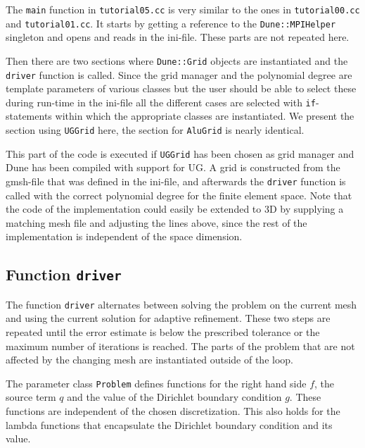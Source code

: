 \documentclass[a4paper,12pt]{article}
\begin{document}
The \lstinline{main} function  in \lstinline{tutorial05.cc} is very similar to the ones
in \lstinline{tutorial00.cc} and \lstinline{tutorial01.cc}. It starts by getting a reference
to the \lstinline{Dune::MPIHelper} singleton and opens and reads in the ini-file.
These parts are not repeated here.

Then there are two sections where \lstinline{Dune::Grid} objects are instantiated
and the \lstinline{driver} function is called. Since the grid manager
and the polynomial degree are template parameters of various classes
but the user should be able to select these during run-time in the ini-file all
the different cases are selected with \lstinline{if}-statements within which
the appropriate classes are instantiated. We present the section using
\lstinline{UGGrid} here, the section for \lstinline{AluGrid} is nearly identical.


This part of the code is executed if \lstinline{UGGrid} has been chosen as grid manager
and Dune has been compiled with support for UG. A grid is constructed from the gmsh-file that
was defined in the ini-file, and afterwards the \lstinline{driver} function is called
with the correct polynomial degree for the finite element space. Note that the code of
the implementation could easily be extended to 3D by supplying a matching mesh file and
adjusting the lines above, since the rest of the implementation is independent of the
space dimension.

\subsection{Function \lstinline{driver}}

The function \lstinline{driver} alternates between solving the problem on the current mesh
and using the current solution for adaptive refinement. These two steps are repeated until
the error estimate is below the prescribed tolerance or the maximum number of iterations is
reached. The parts of the problem that are not affected by the changing mesh are instantiated
outside of the loop.


The parameter class \lstinline{Problem} defines functions for the right hand side
$f$, the source term $q$ and the value of the Dirichlet boundary condition $g$. These
functions are independent of the chosen discretization. This also holds for the lambda
functions that encapsulate the Dirichlet boundary condition and its value.
\end{document}
